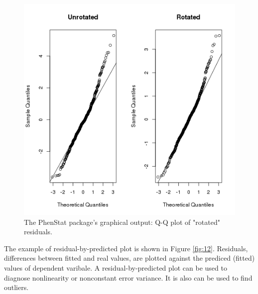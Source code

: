 \documentclass[12pt,a4paper]{article}
\begin{document}
\begin{figure}[!htpb]%
\centerline{\includegraphics[scale=0.5]{qqplotRotatedResiduals.png}}
\caption{The PhenStat package's graphical output: Q-Q plot of "rotated" residuals.}\label{fig:11}
\end{figure}

The example of residual-by-predicted plot is shown in Figure \ref{fig:12}. Residuals, differences between fitted and real values, are plotted against the prediced (fitted) values of dependent varibale.  A residual-by-predicted plot can be used to diagnose nonlinearity or nonconstant error variance. It is also can be used to find outliers. 
\end{document}
